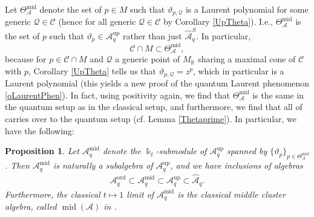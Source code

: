 \documentclass{amsart}
\DeclareMathOperator{\up}{up}
\DeclareMathOperator{\midd}{mid}
\DeclareMathOperator{\ord}{ord}
\let\bb=\mathbb
\let\s=\mathcal
\let\wh=\widehat
\newcommand {\kk} {\Bbbk}
\newcommand {\kt} {\kk_t}
\newcommand {\sQ} {\mathcal{Q}}
\theoremstyle{plain}%
\newtheorem{prop}[thm]{Proposition}
\theoremstyle{definition}
\theoremstyle{remark}
\begin{document}
Let $\Theta_{\s{A}}^{\midd}$ denote the set of $p\in M$ such that $\vartheta_{p,\sQ}$ is a Laurent polynomial for some generic $\sQ\in \s{C}$ (hence for all generic $\sQ\in \s{C}$ by Corollary \ref{UpTheta}).  I.e., $\Theta_{\s{A}}^{\midd}$ is the set of $p$ such that $\vartheta_p\in \s{A}_q^{\up}$ rather than just $\wh{\s{A}}_q^S$.  In particular, $$\s{C}\cap M\subset \Theta_{\s{A}}^{\midd},$$ because for $p\in \s{C}\cap M$ and $\sQ$ a generic point of $M_{\bb{R}}$ sharing a maximal cone of $\s{C}$ with $p$, Corollary \ref{UpTheta} tells us that $\vartheta_{p,\sQ}=z^p$, which in particular is a Laurent polynomial (this yields a new proof of the quantum Laurent phenomenon \eqref{qLaurentPhen}).  In fact, using positivity again, we find that $\Theta_{\s{A}}^{\midd}$ is the same in the quantum setup as in the classical setup, and furthermore, we find that all of \cite[Theorem 7.5]{GHKK} carries over to the quantum setup (cf. Lemma \ref{Thetaprime}).  In particular, we have the following:
\begin{prop}\label{MidAll}
Let $\s{A}_q^{\midd}$ denote the $\kt$-submodule of $\s{A}_q^{\up}$ spanned by $\{\vartheta_p\}_{p\in \Theta_{\s{A}}^{\midd}}$.  Then $\s{A}_q^{\midd}$ is naturally a subalgebra of $\s{A}_q^{\up}$, and we have inclusions of algebras
\begin{align*}
    \s{A}_q^{\ord} \subset \s{A}_q^{\midd} \subset \s{A}_q^{\up} \subset \wh{\s{A}}_q.
\end{align*}
Furthermore, the classical $t\mapsto 1$ limit of $\s{A}_q^{\midd}$ is the classical middle cluster algebra, called $\midd(\s{A})$ in \cite{GHKK}.
\end{prop}
\end{document}
